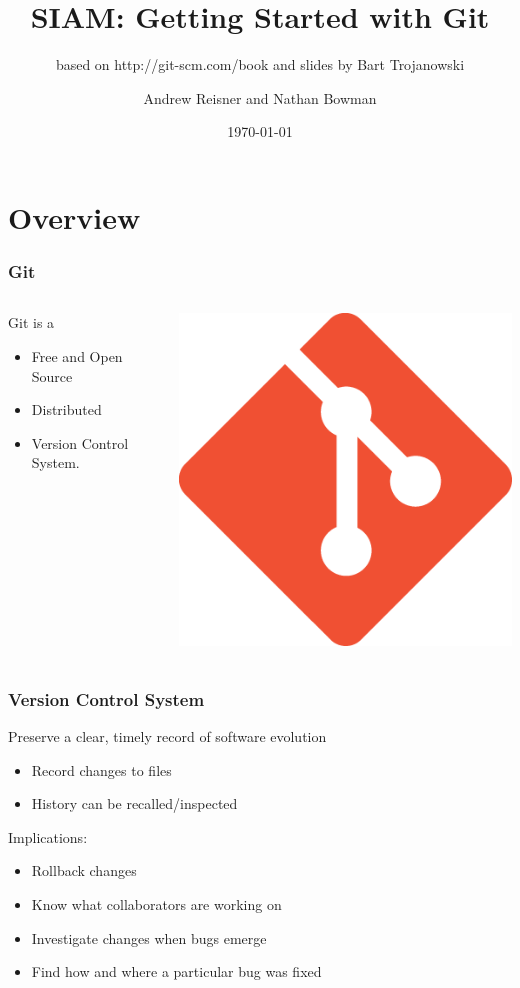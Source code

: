 \documentclass[english,compress]{beamer}
\title{SIAM: Getting Started with Git}
\subtitle{based on http://git-scm.com/book and slides by Bart Trojanowski}
\author{Andrew Reisner and Nathan Bowman}
\date{\today}
\begin{document}
\nocite{*}
\frame{\titlepage}

\section{Overview}
\frame
{
    \frametitle{Git}
    \begin{columns}
    \begin{column}{.5\textwidth}
        Git is a
        \begin{itemize}
            \item Free and Open Source
            \item Distributed
            \item Version Control System.
        \end{itemize}
    \end{column}
    \begin{column}{.5\textwidth}
        \begin{center}
            \includegraphics[width=.7\textwidth]{figs/git-logo.png} 
        \end{center}
    \end{column}
    \end{columns}
}

\frame
{
    \frametitle{Version Control System}

        Preserve a clear, timely record of software evolution
            \begin{itemize}
                \item Record changes to files
                \item History can be recalled/inspected
            \end{itemize}
        Implications:
            \begin{itemize}
                \item Rollback changes
                \item Know what collaborators are working on
                \item Investigate changes when bugs emerge
                \item Find how and where a particular bug was fixed
            \end{itemize}
}
\end{document}
